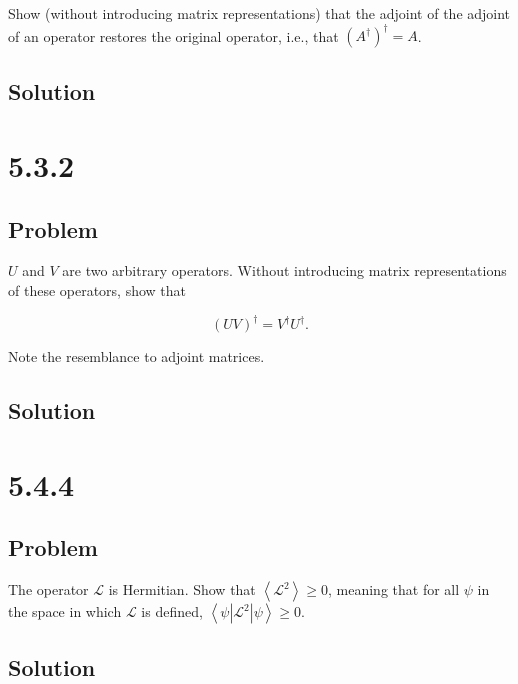 \documentclass[12pt]{article}
\begin{document}
Show (without introducing matrix representations) that the adjoint of the adjoint of an operator restores the original operator, i.e., that \({\left(A^{\dagger}\right)}^{\dagger}=A\).

\subsection{Solution}

\newpage
\section{5.3.2}

\subsection{Problem}

\(U\) and \(V\) are two arbitrary operators. Without introducing matrix representations of these operators, show that

\[
    {(U V)}^{\dagger}=V^{\dagger} U^{\dagger} .
\]

Note the resemblance to adjoint matrices.

\subsection{Solution}

\newpage
\section{5.4.4}

\subsection{Problem}

The operator \(\mathcal{L}\) is Hermitian. Show that \(\left\langle\mathcal{L}^2\right\rangle \geq 0\), meaning that for all \(\psi \) in the space in which \(\mathcal{L}\) is defined, \(\left\langle\psi\left|\mathcal{L}^2\right| \psi\right\rangle \geq 0\).

\subsection{Solution}

\newpage


\nocite{El-Deeb_PEU-356_Assignments}
\end{document}
